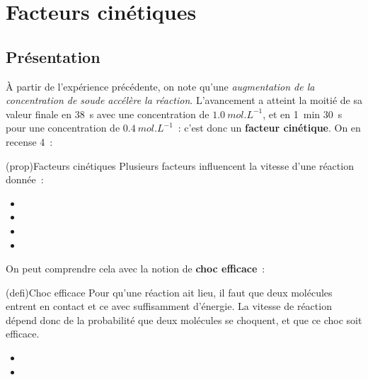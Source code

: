 \documentclass[../../main/main.tex]{subfiles}
\begin{document}
\section{Facteurs cinétiques}

\subsection{Présentation}

À partir de l'expérience précédente, on note qu'une \textit{augmentation de la
	concentration de soude accélère la réaction}. L'avancement a atteint la moitié
de sa valeur finale en \SI{38}{s} avec une concentration de
$\SI{1.0}{mol.L^{-1}}$, et en \SI{1}{min} \SI{30}{s} pour une concentration de
$\SI{0.4}{mol.L^{-1}}$~: c'est donc un \textbf{facteur cinétique}. On en recense
4~:

\begin{tcb*}[label=prop:factciné, breakable](prop){Facteurs cinétiques}
	Plusieurs facteurs influencent la vitesse d'une réaction donnée~:
	\begin{itemize}
		\item {}%
		\item {}%
		\item {}%
		\item {}%
	\end{itemize}
\end{tcb*}

On peut comprendre cela avec la notion de \textbf{choc efficace}~:

\begin{tcb*}(defi){Choc efficace}
	Pour qu'une réaction ait lieu, il faut que deux molécules entrent en contact
	et ce avec suffisamment d'énergie. La vitesse de réaction dépend donc de la
	probabilité que deux molécules se choquent, et que ce choc soit efficace.
	\begin{itemize}
		\item {}%
		\item {}%
	\end{itemize}
\end{tcb*}
\end{document}
